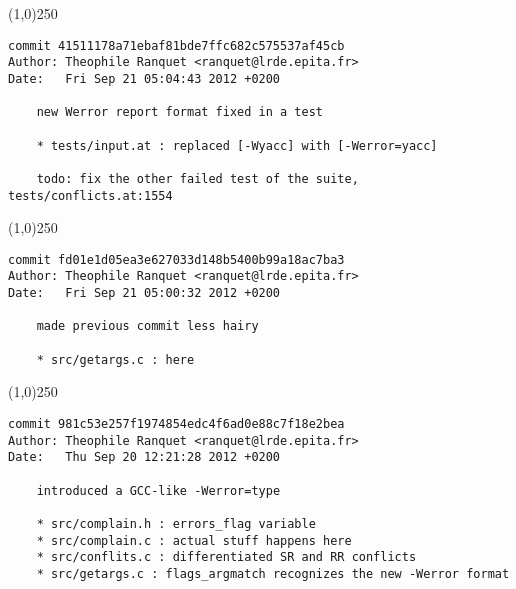 \line(1,0){250}
\begin{verbatim}
commit 41511178a71ebaf81bde7ffc682c575537af45cb
Author: Theophile Ranquet <ranquet@lrde.epita.fr>
Date:   Fri Sep 21 05:04:43 2012 +0200

    new Werror report format fixed in a test
    
    * tests/input.at : replaced [-Wyacc] with [-Werror=yacc]
    
    todo: fix the other failed test of the suite, tests/conflicts.at:1554

\end{verbatim}
\line(1,0){250}
\begin{verbatim}
commit fd01e1d05ea3e627033d148b5400b99a18ac7ba3
Author: Theophile Ranquet <ranquet@lrde.epita.fr>
Date:   Fri Sep 21 05:00:32 2012 +0200

    made previous commit less hairy
    
    * src/getargs.c : here

\end{verbatim}
\line(1,0){250}
\begin{verbatim}
commit 981c53e257f1974854edc4f6ad0e88c7f18e2bea
Author: Theophile Ranquet <ranquet@lrde.epita.fr>
Date:   Thu Sep 20 12:21:28 2012 +0200

    introduced a GCC-like -Werror=type
    
    * src/complain.h : errors_flag variable
    * src/complain.c : actual stuff happens here
    * src/conflits.c : differentiated SR and RR conflicts
    * src/getargs.c : flags_argmatch recognizes the new -Werror format

\end{verbatim}
